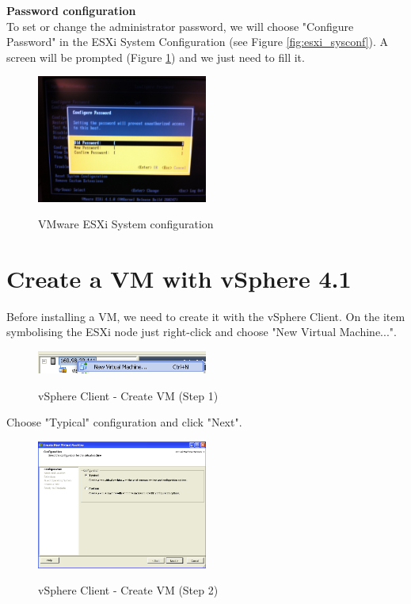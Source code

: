 \textbf{Password configuration}\\
To set or change the administrator password, we will choose "Configure Password" in the ESXi System Configuration (see Figure \ref{fig:esxi_sysconf}). A screen will be prompted (Figure \ref{fig:esxi_sysconf_pass}) and we just need to fill it. 
\begin{figure}[ht]
	\caption{VMware ESXi System configuration}
  	\centering
	\includegraphics[width=0.5\textwidth]{./pic/esxi_13.jpg}
	\label{fig:esxi_sysconf_pass}
\end{figure}


\section{Create a VM with vSphere 4.1}
\label{app:createvm}

Before installing a VM, we need to create it with the vSphere Client. On the item symbolising the ESXi node just right-click and choose "New Virtual Machine...". 

\begin{figure}[ht]
	\caption{vSphere Client - Create VM (Step 1)}
  	\centering
	\includegraphics[width=0.5\textwidth]{./pic/createvm_1.png}
	\label{fig:createvm_1}
\end{figure}
\pagebreak


Choose "Typical" configuration and click "Next".
\begin{figure}[ht]
	\caption{vSphere Client - Create VM (Step 2)}
  	\centering
	\includegraphics[width=0.5\textwidth]{./pic/createvm_2.png}
	\label{fig:createvm_2}
\end{figure}

